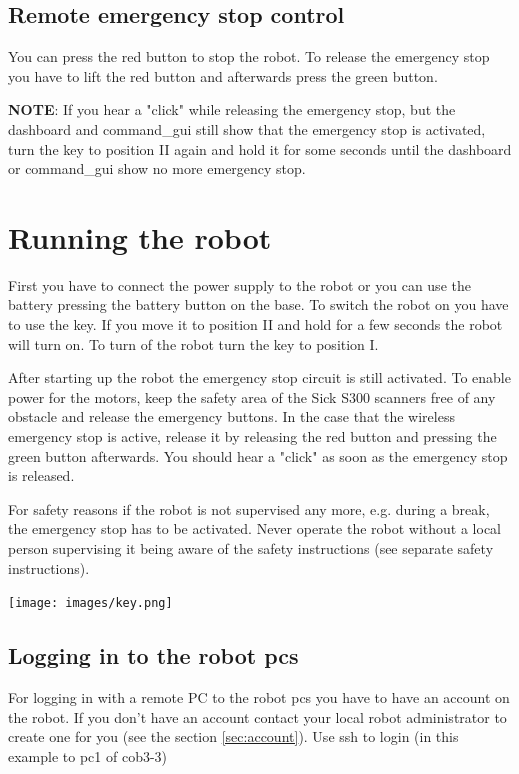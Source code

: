 \subsection{Remote emergency stop control}
You can press the red button to stop the robot. To release the emergency stop you have to lift the red button and afterwards press the green button.


\textbf{NOTE}: If you hear a "click" while releasing the emergency stop, but the dashboard and command\_gui still show that the emergency stop is activated, turn the key to position II again and hold it for some seconds until the dashboard or command\_gui show no more emergency stop.


\section{Running the robot}
First you have to connect the power supply to the robot or you can use the battery pressing the battery button on the base. To switch the robot on you have to use the key. If you move it to position II and hold for a few seconds the robot will turn on. To turn of the robot turn the key to position I. 

After starting up the robot the emergency stop circuit is still activated. To enable power for the motors, keep the safety area of the Sick S300 scanners free of any obstacle and release the emergency buttons. In the case that the wireless emergency stop is active, release it by releasing the red button and pressing the green button afterwards. You should hear a "click" as soon as the emergency stop is released.

For safety reasons if the robot is not supervised any more, e.g. during a break, the emergency stop has to be activated. Never operate the robot without a local person supervising it being aware of the safety instructions (see separate safety instructions).

\begin{center}
\texttt{[image: images/key.png]}
\end{center}


\subsection{Logging in to the robot pcs}
For logging in with a remote PC to the robot pcs you have to have an account on the robot. If you don't have an account contact your local robot administrator to create one for you (see the section \ref{sec:account}). Use ssh to login (in this example to pc1 of cob3-3)

